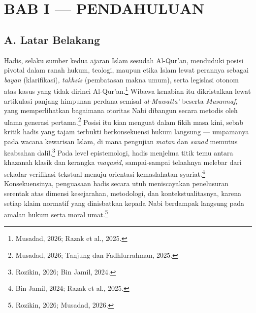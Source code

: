 
\section*{BAB I --- PENDAHULUAN}

\subsection*{A. Latar Belakang}

Hadis, selaku sumber kedua ajaran Islam sesudah Al-Qur'an, menduduki posisi pivotal dalam ranah hukum, teologi, maupun etika Islam lewat perannya sebagai \textit{bayan} (klarifikasi), \textit{takhsis} (pembatasan makna umum), serta legislasi otonom atas kasus yang tidak dirinci Al-Qur'an.\footnote{Musadad, 2026; Razak et al., 2025.} Wibawa kenabian itu dikristalkan lewat artikulasi panjang himpunan perdana semisal \textit{al-Muwatta'} beserta \textit{Musannaf}, yang memperlihatkan bagaimana otoritas Nabi dibangun secara metodis oleh ulama generasi pertama.\footnote{Musadad, 2026; Tanjung dan Fadhlurrahman, 2025.} Posisi itu kian menguat dalam fikih masa kini, sebab kritik hadis yang tajam terbukti berkonsekuensi hukum langsung --- umpamanya pada wacana kewarisan Islam, di mana pengujian \textit{matan} dan \textit{sanad} memutus keabsahan dalil.\footnote{Rozikin, 2026; Bin Jamil, 2024.} Pada level epistemologi, hadis menjelma titik temu antara khazanah klasik dan kerangka \textit{maqasid}, sampai-sampai telaahnya melebar dari sekadar verifikasi tekstual menuju orientasi kemaslahatan syariat.\footnote{Bin Jamil, 2024; Razak et al., 2025.} Konsekuensinya, penguasaan hadis secara utuh meniscayakan penelusuran serentak atas dimensi kesejarahan, metodologi, dan kontekstualitasnya, karena setiap klaim normatif yang dinisbatkan kepada Nabi berdampak langsung pada amalan hukum serta moral umat.\footnote{Rozikin, 2026; Musadad, 2026.}

